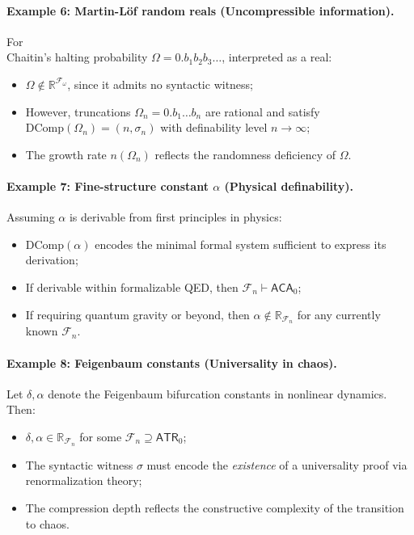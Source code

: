 \documentclass[12pt]{article}
\theoremstyle{definition}
\theoremstyle{plain}
\theoremstyle{remark}
\begin{document}
\paragraph{Example 6: Martin-Löf random reals (Uncompressible information).}
For \\Chaitin’s halting probability \( \Omega = 0.b_1b_2b_3\dots \), interpreted as a real:
\begin{itemize}
    \item \( \Omega \notin \mathbb{R}^{\mathcal{F}_\omega} \), since it admits no syntactic witness;
    \item However, truncations \( \Omega_n = 0.b_1\dots b_n \) are rational and satisfy \( \mathrm{DComp}(\Omega_n) = (n, \sigma_n) \) with definability level \( n \to \infty \);
    \item The growth rate \( n(\Omega_n) \) reflects the randomness deficiency of \( \Omega \).
\end{itemize}

\paragraph{Example 7: Fine-structure constant \( \alpha \) (Physical definability).}
Assuming \( \alpha \) is derivable from first principles in physics:
\begin{itemize}
    \item \( \mathrm{DComp}(\alpha) \) encodes the minimal formal system sufficient to express its derivation;
    \item If derivable within formalizable QED, then \( \mathcal{F}_n \vdash \mathsf{ACA}_0 \);
    \item If requiring quantum gravity or beyond, then \( \alpha \notin \mathbb{R}_{\mathcal{F}_n} \) for any currently known \( \mathcal{F}_n \).
\end{itemize}

\paragraph{Example 8: Feigenbaum constants (Universality in chaos).}
Let \( \delta, \alpha \) denote the Feigenbaum bifurcation constants in nonlinear dynamics. Then:
\begin{itemize}
    \item \( \delta, \alpha \in \mathbb{R}_{\mathcal{F}_n} \) for some \( \mathcal{F}_n \supseteq \mathsf{ATR}_0 \);
    \item The syntactic witness \( \sigma \) must encode the \emph{existence} of a universality proof via renormalization theory;
    \item The compression depth reflects the constructive complexity of the transition to chaos.
\end{itemize}
\end{document}

